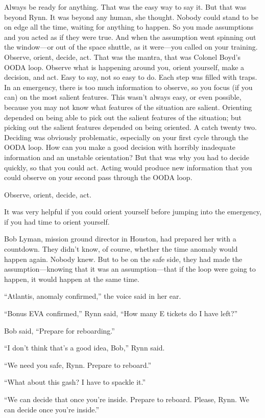 Always be ready for anything. That was the easy way to say it. But that was beyond Rynn. It was beyond any human, she thought. Nobody could stand to be on edge all the time, waiting for anything to happen. So you made assumptions and you acted as if they were true. And when the assumption went spinning out the window—or out of the space shuttle, as it were—you called on your training. Observe, orient, decide, act. That was the mantra, that was Colonel Boyd’s OODA loop. Observe what is happening around you, orient yourself, make a decision, and act. Easy to say, not so easy to do. Each step was filled with traps. In an emergency, there is too much information to observe, so you focus (if you can) on the most salient features. This wasn’t always easy, or even possible, because you may not know what features of the situation are salient. Orienting depended on being able to pick out the salient features of the situation; but picking out the salient features depended on being oriented. A catch twenty two. Deciding was obviously problematic, especially on your first cycle through the OODA loop. How can you make a good decision with horribly inadequate information and an unstable orientation? But that was why you had to decide quickly, so that you could act. Acting would produce new information that you could observe on your second pass through the OODA loop.

Observe, orient, decide, act.

It was very helpful if you could orient yourself before jumping into the emergency, if you had time to orient yourself.

Bob Lyman, mission ground director in Houston, had prepared her with a countdown. They didn’t know, of course, whether the time anomaly would happen again. Nobody knew. But to be on the safe side, they had made the assumption—knowing that it was an assumption—that if the loop were going to happen, it would happen at the same time.

“Atlantis, anomaly confirmed,” the voice said in her ear.

“Bonus EVA confirmed,” Rynn said, “How many E tickets do I have left?”

Bob said, “Prepare for reboarding.”

“I don’t think that’s a good idea, Bob,” Rynn said.

“We need you safe, Rynn. Prepare to reboard.”

“What about this gash? I have to spackle it.”

“We can decide that once you’re inside. Prepare to reboard. Please, Rynn. We can decide once you’re inside.”

